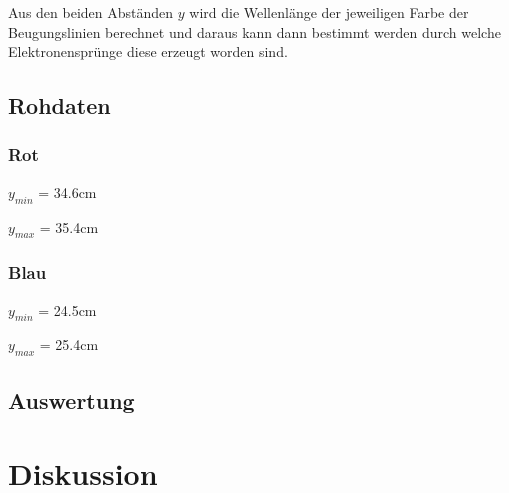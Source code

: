 \documentclass[12pt,a4paper]{article}
\begin{document}
Aus den beiden Abst\"anden $y$ wird die Wellenl\"ange der jeweiligen Farbe der Beugungslinien berechnet und daraus kann dann bestimmt werden durch welche Elektronenspr\"unge diese erzeugt worden sind.

\subsection*{Rohdaten}
\subsubsection*{Rot}
$y_{min}$ = 34.6cm

$y_{max}$ = 35.4cm

\subsubsection*{Blau}
$y_{min}$ = 24.5cm

$y_{max}$ = 25.4cm

\subsection*{Auswertung}


\section*{Diskussion}
\end{document}
